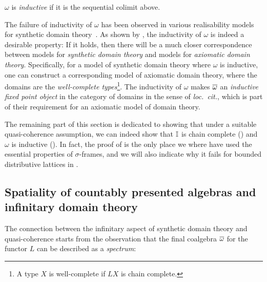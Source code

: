 \begin{definition}
  $\omega$ is \emph{inductive} if it is the sequential colimit above.
\end{definition}
The failure of inductivity of $\omega$ has been observed in various realisability models for synthetic domain theory~\citep{VANOOSTEN2000233}. As shown by \citet{fiore-plotkin:1996}, the inductivity of $\omega$ is indeed a desirable property: If it holds, then there will be a much closer correspondence between models for \emph{synthetic domain theory} and models for \emph{axiomatic domain theory}. Specifically, for a model of synthetic domain theory where $\omega$ is inductive, one can construct a corresponding model of axiomatic domain theory, where the domains are the \emph{well-complete types}\footnote{A type $X$ is well-complete if $LX$ is chain complete.}. The inductivity of $\omega$ makes $\overline{\omega}$ an \emph{inductive fixed point object} in the category of domains in the sense of \emph{loc.\ cit.}, which is part of their requirement for an axiomatic model of domain theory. 

The remaining part of this section is dedicated to showing that under a suitable quasi-coherence assumption, we can indeed show that $\mathbb{I}$ is chain complete () and $\omega$ is inductive (). In fact, the proof of  is the only place we where have used the essential properties of $\sigma$-frames, and we will also indicate why it fails for bounded distributive lattices in .

\subsection{Spatiality of countably presented algebras and infinitary domain theory}
The connection between the infinitary aspect of synthetic domain theory and quasi-coherence starts from the observation that the final coalgebra $\overline{\omega}$ for the functor $L$ can be described as a \emph{spectrum}:

